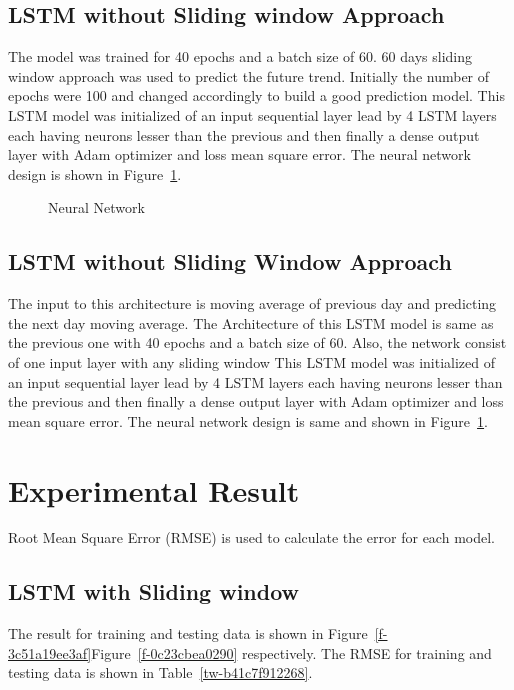 \documentclass[5p,,preprint,12pt,twocolumn]{elsarticle}
\makeatletter
\def\fixFloatSize#1{}%
\makeatother
\begin{document}
\subsection{LSTM without Sliding window Approach}The model was trained for 40 epochs and a batch size of 60. 60 days sliding window approach was used to predict the future trend. Initially the number of epochs were 100 and changed accordingly to build a good prediction model. This LSTM model was initialized of an input sequential layer lead by 4 LSTM layers each having neurons lesser than the previous and then finally a dense output layer with Adam optimizer and loss mean square error. The neural network design is shown in Figure~\ref{f-d4890a1b6b6b}.
\bgroup
\fixFloatSize{images/168f36c6-015d-4f38-9a7f-b3834427891f-uneural-network.jpg}
\begin{figure}[!htbp]
\centering \makeatletter{}
\makeatother 
\caption{{Neural Network}}
\label{f-d4890a1b6b6b}
\end{figure}
\egroup




\subsection{LSTM without Sliding Window Approach}The input to this architecture is moving average of previous day and predicting the next day moving average. The Architecture of this LSTM model is same as the previous one with 40 epochs and a batch size of 60. Also, the network consist of one input layer with any sliding window This LSTM model was initialized of an input sequential layer lead by 4 LSTM layers each having neurons lesser than the previous and then finally a dense output layer with Adam optimizer and loss mean square error. The neural network design is same and shown in Figure~\ref{f-d4890a1b6b6b}.
    
\section{Experimental Result}
Root Mean Square Error (RMSE) is used to calculate the error for each model. 



\subsection{LSTM with Sliding window}The result for training and testing data is shown in Figure~\ref{f-3c51a19ee3af}Figure~\ref{f-0c23cbea0290} respectively. The RMSE for training and testing data is shown in Table~\ref{tw-b41c7f912268}.
\end{document}

